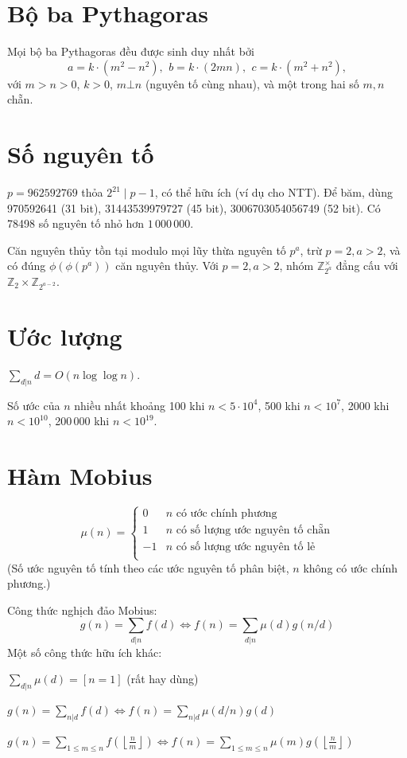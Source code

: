 \section{Bộ ba Pythagoras}
 Mọi bộ ba Pythagoras đều được sinh duy nhất bởi
 \[ a=k\cdot (m^{2}-n^{2}),\ \,b=k\cdot (2mn),\ \,c=k\cdot (m^{2}+n^{2}), \]
 với $m > n > 0$, $k > 0$, $m \bot n$ (nguyên tố cùng nhau), và một trong hai số $m, n$ chẵn.

\section{Số nguyên tố}
	$p=962592769$ thỏa $2^{21} \mid p-1$, có thể hữu ích (ví dụ cho NTT). Để băm,
	dùng 970592641 (31 bit), 31443539979727 (45 bit), 3006703054056749
	(52 bit). Có 78498 số nguyên tố nhỏ hơn $1\,000\,000$.

	Căn nguyên thủy tồn tại modulo mọi lũy thừa nguyên tố $p^a$, trừ $p = 2, a > 2$, và có đúng $\phi(\phi(p^a))$ căn nguyên thủy.
	Với $p = 2, a > 2$, nhóm $\mathbb Z_{2^a}^\times$ đẳng cấu với $\mathbb Z_2 \times \mathbb Z_{2^{a-2}}$.

\section{Ước lượng}
	$\sum_{d|n} d = O(n \log \log n)$.

	Số ước của $n$ nhiều nhất khoảng 100 khi $n < 5\cdot 10^4$, 500 khi $n < 10^7$, 2000 khi $n < 10^{10}$, 200\,000 khi $n < 10^{19}$.

\section{Hàm Mobius}
\[
	\mu(n) = \begin{cases} 0 & n \textrm{ có ước chính phương}\\ 1 & n \textrm{ có số lượng ước nguyên tố chẵn}\\ -1 & n \textrm{ có số lượng ước nguyên tố lẻ}\\\end{cases}
\]
  (Số ước nguyên tố tính theo các ước nguyên tố phân biệt, $n$ không có ước chính phương.)

  Công thức nghịch đảo Mobius:
  \[ g(n) = \sum_{d|n} f(d) \Leftrightarrow f(n) = \sum_{d|n} \mu(d)g(n/d) \]
  Một số công thức hữu ích khác:

  $ \sum_{d | n} \mu(d) = [ n = 1] $ (rất hay dùng)

  $ g(n) = \sum_{n|d} f(d) \Leftrightarrow f(n) = \sum_{n|d} \mu(d/n)g(d)$

 $ g(n) = \sum_{1 \leq m \leq n} f(\left\lfloor\frac{n}{m}\right \rfloor ) \Leftrightarrow f(n) = \sum_{1\leq m\leq n} \mu(m)g(\left\lfloor\frac{n}{m}\right\rfloor)$
